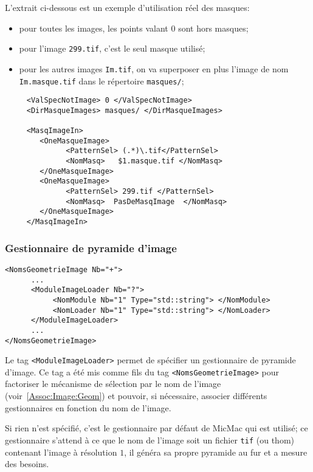 L'extrait ci-dessous est un exemple d'utilisation r\'eel des masques:

\begin{itemize}
  \item pour toutes les images, les points valant $0$ sont hors masques;

  \item pour l'image {\tt 299.tif}, c'est le seul masque utilis\'e; 

  \item pour les autres images {\tt Im.tif}, on va superposer en plus l'image
        de nom {\tt Im.masque.tif} dans le r\'epertoire {\tt masques/};
        
\end{itemize}


\begin{verbatim}
     <ValSpecNotImage> 0 </ValSpecNotImage>
     <DirMasqueImages> masques/ </DirMasqueImages>

     <MasqImageIn>
        <OneMasqueImage>
              <PatternSel> (.*)\.tif</PatternSel>
              <NomMasq>   $1.masque.tif </NomMasq>
        </OneMasqueImage>
        <OneMasqueImage>
              <PatternSel> 299.tif </PatternSel>
              <NomMasq>  PasDeMasqImage  </NomMasq>
        </OneMasqueImage>
     </MasqImageIn>
\end{verbatim}


\subsubsection{Gestionnaire de pyramide d'image}

\begin{verbatim}
<NomsGeometrieImage Nb="+">
      ...
      <ModuleImageLoader Nb="?">
           <NomModule Nb="1" Type="std::string"> </NomModule>
           <NomLoader Nb="1" Type="std::string"> </NomLoader>
      </ModuleImageLoader>
      ...
</NomsGeometrieImage>
\end{verbatim}

Le tag {\tt <ModuleImageLoader>} permet de sp\'ecifier  un gestionnaire
de pyramide d'image. Ce tag a \'et\'e mis comme fils du tag
{\tt <NomsGeometrieImage>} pour factoriser le m\'ecanisme de s\'election
par le nom de l'image (voir~\ref{Assoc:Image:Geom}) et pouvoir, si n\'ecessaire, associer
diff\'erents gestionnaires en fonction du nom de l'image.

Si rien n'est sp\'ecifi\'e, c'est le gestionnaire par d\'efaut de MicMac
qui est utilis\'e;  ce gestionnaire s'attend \`a ce que le nom de l'image
soit un fichier {\tt tif} (ou thom) contenant l'image \`a r\'esolution
$1$, il g\'en\'era sa propre pyramide au fur et a mesure des besoins.

